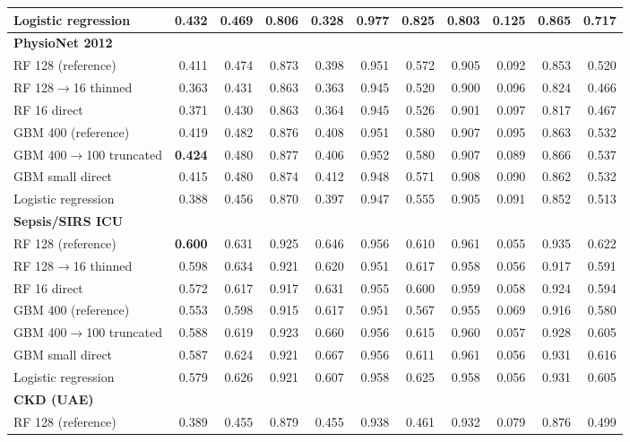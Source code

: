 {\begin{longtable}{lrrrrrrrrrr}
\quad Logistic regression & 0.432 & 0.469 & 0.806 & 0.328 & 0.977 & 0.825 & 0.803 & 0.125 & 0.865 & 0.717 \\
\midrule
\multicolumn{11}{l}{\textbf{PhysioNet 2012}} \\*
\quad RF 128 (reference) & 0.411 & 0.474 & 0.873 & 0.398 & 0.951 & 0.572 & 0.905 & 0.092 & 0.853 & 0.520 \\
\quad RF 128$\rightarrow$16 thinned & 0.363 & 0.431 & 0.863 & 0.363 & 0.945 & 0.520 & 0.900 & 0.096 & 0.824 & 0.466 \\
\quad RF 16 direct & 0.371 & 0.430 & 0.863 & 0.364 & 0.945 & 0.526 & 0.901 & 0.097 & 0.817 & 0.467 \\
\quad GBM 400 (reference) & 0.419 & 0.482 & 0.876 & 0.408 & 0.951 & 0.580 & 0.907 & 0.095 & 0.863 & 0.532 \\
\quad GBM 400$\rightarrow$100 truncated & \textbf{0.424} & 0.480 & 0.877 & 0.406 & 0.952 & 0.580 & 0.907 & 0.089 & 0.866 & 0.537 \\
\quad GBM small direct & 0.415 & 0.480 & 0.874 & 0.412 & 0.948 & 0.571 & 0.908 & 0.090 & 0.862 & 0.532 \\
\quad Logistic regression & 0.388 & 0.456 & 0.870 & 0.397 & 0.947 & 0.555 & 0.905 & 0.091 & 0.852 & 0.513 \\
\midrule
\multicolumn{11}{l}{\textbf{Sepsis/SIRS ICU}} \\*
\quad RF 128 (reference) & \textbf{0.600} & 0.631 & 0.925 & 0.646 & 0.956 & 0.610 & 0.961 & 0.055 & 0.935 & 0.622 \\
\quad RF 128$\rightarrow$16 thinned & 0.598 & 0.634 & 0.921 & 0.620 & 0.951 & 0.617 & 0.958 & 0.056 & 0.917 & 0.591 \\
\quad RF 16 direct & 0.572 & 0.617 & 0.917 & 0.631 & 0.955 & 0.600 & 0.959 & 0.058 & 0.924 & 0.594 \\
\quad GBM 400 (reference) & 0.553 & 0.598 & 0.915 & 0.617 & 0.951 & 0.567 & 0.955 & 0.069 & 0.916 & 0.580 \\
\quad GBM 400$\rightarrow$100 truncated & 0.588 & 0.619 & 0.923 & 0.660 & 0.956 & 0.615 & 0.960 & 0.057 & 0.928 & 0.605 \\
\quad GBM small direct & 0.587 & 0.624 & 0.921 & 0.667 & 0.956 & 0.611 & 0.961 & 0.056 & 0.931 & 0.616 \\
\quad Logistic regression & 0.579 & 0.626 & 0.921 & 0.607 & 0.958 & 0.625 & 0.958 & 0.056 & 0.931 & 0.605 \\
\midrule
\multicolumn{11}{l}{\textbf{CKD (UAE)}} \\*
\quad RF 128 (reference) & 0.389 & 0.455 & 0.879 & 0.455 & 0.938 & 0.461 & 0.932 & 0.079 & 0.876 & 0.499 \\

\end{longtable}}
